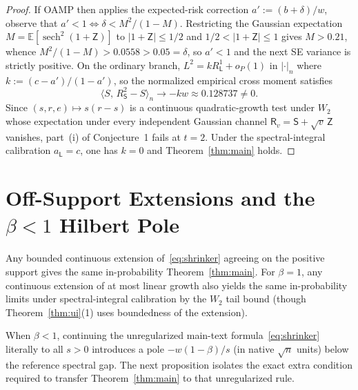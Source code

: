 \documentclass[11pt]{article}
\theoremstyle{plain}
\theoremstyle{definition}
\theoremstyle{remark}
\DeclareMathOperator{\sech}{sech}
\newcommand{\E}{\mathbb{E}}
\newcommand{\sL}{\mathsf{L}}
\newcommand{\sS}{\mathsf{S}}
\newcommand{\sR}{\mathsf{R}}
\newcommand{\sZ}{\mathsf{Z}}
\begin{document}
\begin{proof}
If OAMP then applies the expected-risk correction $a' := (b + \delta)/w$, observe that $a' < 1 \iff \delta < M^2/(1 - M)$. Restricting the Gaussian expectation $M = \E[\sech^2(1+\sZ)]$ to $|1+\sZ| \le 1/2$ and $1/2 < |1+\sZ| \le 1$ gives $M > 0.21$, whence $M^2/(1 - M) > 0.0558 > 0.05 = \delta$, so $a' < 1$ and the next SE variance is strictly positive. On the ordinary branch, $L^2 = k R_{\sL}^1 + o_P(1)$ in $|\cdot|_n$ where $k := (c - a')/(1 - a')$, so the normalized empirical cross moment satisfies
\[
\langle S,\, R_{\sS}^2 - S\rangle_n \longrightarrow -kw \approx 0.128737 \neq 0.
\]
Since $(s, r, e) \mapsto s(r - s)$ is a continuous quadratic-growth test under $W_2$ whose expectation under every independent Gaussian channel $\sR_v = \sS + \sqrt{v}\,\sZ$ vanishes, part~(i) of Conjecture~1 fails at $t = 2$. Under the spectral-integral calibration $a_{\sL} = c$, one has $k = 0$ and Theorem~\ref{thm:main} holds.
\end{proof}

\section{Off-Support Extensions and the \texorpdfstring{$\beta < 1$}{beta < 1} Hilbert Pole}\label{sec:pole}

Any bounded continuous extension of~\eqref{eq:shrinker} agreeing on the positive support gives the same in-probability Theorem~\ref{thm:main}. For $\beta = 1$, any continuous extension of at most linear growth also yields the same in-probability limits under spectral-integral calibration by the $W_2$ tail bound (though Theorem~\ref{thm:ui}(1) uses boundedness of the extension).

When $\beta < 1$, continuing the unregularized main-text formula~\eqref{eq:shrinker} literally to all $s > 0$ introduces a pole $-w(1-\beta)/s$ (in native $\sqrt{n}$ units) below the reference spectral gap. The next proposition isolates the exact extra condition required to transfer Theorem~\ref{thm:main} to that unregularized rule.
\end{document}
